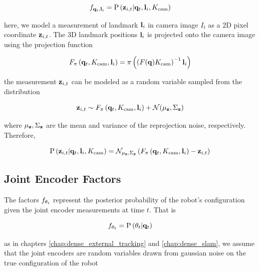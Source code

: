 \begin{equation} 
	f_{\mathbf{q}_t, \mathbf{l}_i} = \text{P}\left( \mathbf{z}_{i, t} | \mathbf{q}_t, \mathbf{l}_i, K_\text{cam}\right)
\end{equation}

\noindent here, we model a measurement of landmark $\mathbf{l}_i$ in camera image $I_t$ as a 2D pixel coordinate $\mathbf{z}_{i, t}$. The 3D landmark positions $\mathbf{l}_i$ is projected onto the camera image using the projection function

\begin{equation}
	 F_{\pi}\left(\mathbf{q}_t, K_\text{cam}, \mathbf{l}_i\right) = \pi\left(\left(F(\mathbf{q}) K_\text{cam} \right)^{-1}\mathbf{l}_i\right) 
\end{equation}

\noindent the measurement $\mathbf{z}_{i, t}$ can be modeled as a random variable sampled from the distribution

\begin{equation}
	\mathbf{z}_{i, t} \sim F_{\pi}\left(\mathbf{q}_t, K_\text{cam}, \mathbf{l}_i\right) + \mathcal{N}(\mu_{\mathbf{z}}, \Sigma_{\mathbf{z}})
\end{equation}

\noindent where $\mu_{\mathbf{z}}, \Sigma_{\mathbf{z}}$ are the mean and variance of the reprojection noise, respectively. Therefore,

\begin{equation}
	\text{P}\left( \mathbf{z}_{i, t} | \mathbf{q}_t, \mathbf{l}_i, K_\text{cam}\right) = \mathcal{N}_{\mu_{\mathbf{z}}, \Sigma_{\mathbf{z}}}\left(F_{\pi}\left(\mathbf{q}_t, K_\text{cam}, \mathbf{l}_i\right) - \mathbf{z}_{i, t}\right)
\end{equation}

\subsection{Joint Encoder Factors}
The factors $f_{\theta_t}$ represent the posterior probability of the robot's configuration given the joint encoder measurements at time $t$. That is

\begin{equation}
	f_{\theta_t} = \text{P}\left(\theta_t | \mathbf{q}_t\right)
\end{equation}

\noindent as in chapters \ref{chap:dense_external_tracking} and \ref{chap:dense_slam}, we assume that the joint encoders are random variables drawn from gaussian noise on the true configuration of the robot

